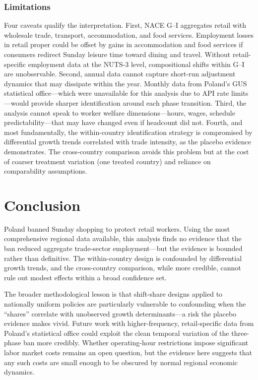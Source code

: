 \documentclass[12pt]{article}
\begin{document}
\subsubsection*{Limitations} Four caveats qualify the interpretation. First, NACE G--I aggregates retail with wholesale trade, transport, accommodation, and food services. Employment losses in retail proper could be offset by gains in accommodation and food services if consumers redirect Sunday leisure time toward dining and travel. Without retail-specific employment data at the NUTS-3 level, compositional shifts within G--I are unobservable. Second, annual data cannot capture short-run adjustment dynamics that may dissipate within the year. Monthly data from Poland's GUS statistical office---which were unavailable for this analysis due to API rate limits---would provide sharper identification around each phase transition. Third, the analysis cannot speak to worker welfare dimensions---hours, wages, schedule predictability---that may have changed even if headcount did not. Fourth, and most fundamentally, the within-country identification strategy is compromised by differential growth trends correlated with trade intensity, as the placebo evidence demonstrates. The cross-country comparison avoids this problem but at the cost of coarser treatment variation (one treated country) and reliance on comparability assumptions.


\section{Conclusion}

Poland banned Sunday shopping to protect retail workers. Using the most comprehensive regional data available, this analysis finds no evidence that the ban reduced aggregate trade-sector employment---but the evidence is bounded rather than definitive. The within-country design is confounded by differential growth trends, and the cross-country comparison, while more credible, cannot rule out modest effects within a broad confidence set.

The broader methodological lesson is that shift-share designs applied to nationally uniform policies are particularly vulnerable to confounding when the ``shares'' correlate with unobserved growth determinants---a risk the placebo evidence makes vivid. Future work with higher-frequency, retail-specific data from Poland's statistical office could exploit the clean temporal variation of the three-phase ban more credibly. Whether operating-hour restrictions impose significant labor market costs remains an open question, but the evidence here suggests that any such costs are small enough to be obscured by normal regional economic dynamics.
\end{document}
